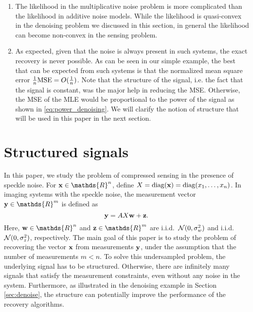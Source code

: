 \documentclass[onecolumn]{IEEEtran}
\newcommand{\wv}{{\bf w}}
\begin{document}
\begin{enumerate}
\item The likelihood in the multiplicative noise problem is more complicated than the likelihood in additive noise models. While the likelihood is quasi-convex in the denoising problem we discussed in this section, in general the likelihood can become non-convex in the sensing problem. 

\item As expected, given that the noise is always present in such systems, the exact recovery is never possible. As can be seen in our simple example, the best that can be expected from such systems is that the normalized mean square error $\frac{1}{n}{\rm MSE} = O(\frac{1}{n})$. Note that the structure of the signal, i.e. the fact that the signal is constant, was the major help in reducing the MSE. Otherwise, the MSE of the MLE would be proportional to the power of the signal as shown in \eqref{eq:power_denoising}. We will clarify the notion of structure that will be used in this paper in the next section. 

\end{enumerate}


\section{Structured signals}\label{sec:structured-signals}
In this paper, we study the problem of compressed sensing in the presence of speckle noise. For $\xv\in\mathds{R}^n$, define  $X=\mathop{\rm diag}\nolimits({\bf x})=\mathop{\rm diag}\nolimits(x_1,\ldots,x_n)$. In imaging systems with the speckle noise, the measurement vector $\yv\in\mathds{R}^m$ is defined as 
\[
\yv=AX\wv+\zv.
\]
Here, $\wv\in\mathds{R}^n$ and $\zv\in\mathds{R}^m$ are i.i.d.~$\mathcal{N}(0,\sigma_w^2)$ and i.i.d.~$\mathcal{N}(0,\sigma_z^2)$, respectively. The main goal of this paper is to study the problem of recovering the vector ${\bf x}$ from measurements ${\bf y}$, under the assumption that the number of measurements $m<n$. To solve this undersampled problem,  the underlying signal has to be structured. Otherwise, there are infinitely many signals that satisfy the measurement constraints, even without any noise in the system. Furthermore, as illustrated in the denoising example in Section \ref{sec:denoise}, the structure can potentially improve the performance of the recovery algorithms. 
\end{document}
